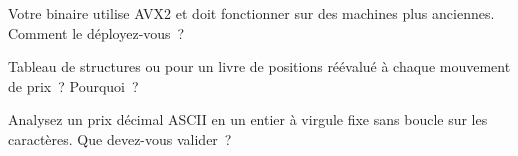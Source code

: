 \begin{interviewq}\label{iq:ll:vector-instructions-and-data-parallel-code:4}
Votre binaire utilise AVX2 et doit fonctionner sur des machines plus anciennes. Comment le déployez-vous~?
\end{interviewq}

\begin{interviewq}\label{iq:ll:vector-instructions-and-data-parallel-code:5}
Tableau de structures ou  pour un livre de positions réévalué à chaque mouvement de prix~? Pourquoi~?
\end{interviewq}

\begin{interviewq}\label{iq:ll:vector-instructions-and-data-parallel-code:6}
Analysez un prix décimal ASCII en un entier à virgule fixe sans boucle sur les caractères. Que devez-vous valider~?
\end{interviewq}
